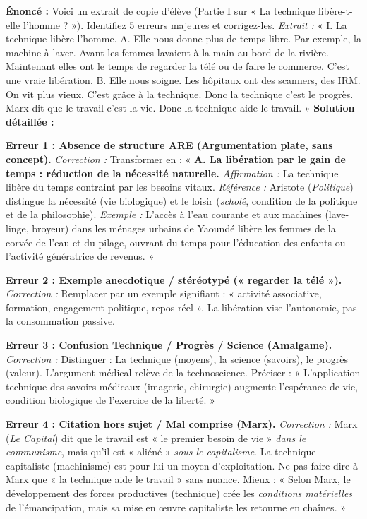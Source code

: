 \documentclass[11pt]{article}
\newcommand{\cle}[1]{{\popxbold\color{popdark}#1}}
\begin{document}
\begin{exoresolu}
\textbf{Énoncé :} Voici un extrait de copie d'élève (Partie I sur « La technique libère-t-elle l'homme ? »). Identifiez 5 erreurs majeures et corrigez-les.
\textit{Extrait :} « I. La technique libère l'homme. A. Elle nous donne plus de temps libre. Par exemple, la machine à laver. Avant les femmes lavaient à la main au bord de la rivière. Maintenant elles ont le temps de regarder la télé ou de faire le commerce. C'est une vraie libération. B. Elle nous soigne. Les hôpitaux ont des scanners, des IRM. On vit plus vieux. C'est grâce à la technique. Donc la technique c'est le progrès. Marx dit que le travail c'est la vie. Donc la technique aide le travail. »
\tcblower
\textbf{Solution détaillée :}

\textbf{Erreur 1 : Absence de structure ARE (Argumentation plate, sans concept).}
\textit{Correction :} Transformer en : « \textbf{A. La libération par le gain de temps : réduction de la nécessité naturelle.} \textit{Affirmation :} La technique libère du temps contraint par les besoins vitaux. \textit{Référence :} Aristote (\emph{Politique}) distingue la \cle{nécessité} (vie biologique) et le \cle{loisir} (\emph{scholê}, condition de la politique et de la philosophie). \textit{Exemple :} L'accès à l'eau courante et aux machines (lave-linge, broyeur) dans les ménages urbains de Yaoundé libère les femmes de la corvée de l'eau et du pilage, ouvrant du temps pour l'éducation des enfants ou l'activité génératrice de revenus. »

\textbf{Erreur 2 : Exemple anecdotique / stéréotypé (« regarder la télé »).}
\textit{Correction :} Remplacer par un exemple signifiant : « activité associative, formation, engagement politique, repos réel ». La libération vise l'\cle{autonomie}, pas la consommation passive.

\textbf{Erreur 3 : Confusion Technique / Progrès / Science (Amalgame).}
\textit{Correction :} Distinguer : La technique (moyens), la science (savoirs), le progrès (valeur). L'argument médical relève de la \cle{technoscience}. Préciser : « L'application technique des savoirs médicaux (imagerie, chirurgie) augmente l'espérance de vie, condition biologique de l'exercice de la liberté. »

\textbf{Erreur 4 : Citation hors sujet / Mal comprise (Marx).}
\textit{Correction :} Marx (\emph{Le Capital}) dit que le travail est « le premier besoin de vie » \emph{dans le communisme}, mais qu'il est « aliéné » \emph{sous le capitalisme}. La technique capitaliste (machinisme) est pour lui un moyen d'exploitation. Ne pas faire dire à Marx que « la technique aide le travail » sans nuance. Mieux : « Selon Marx, le développement des forces productives (technique) crée les \emph{conditions matérielles} de l'émancipation, mais sa mise en œuvre capitaliste les retourne en chaînes. »


\end{exoresolu}
\end{document}
